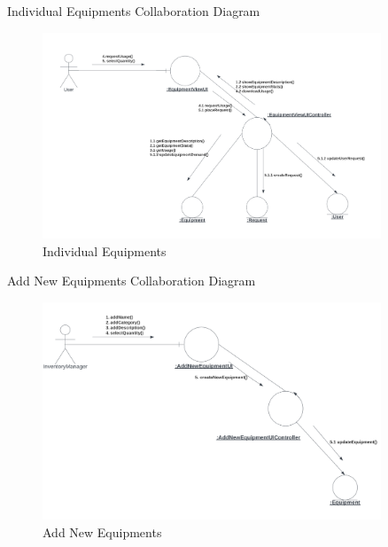\documentclass[20pt]{beamer}
\numberwithin{figure}{section}
\begin{document}
\begin{frame}{Individual Equipments Collaboration Diagram}

     \begin{figure}
        \centering
        \includegraphics[width= 0.9\textwidth , height= 0.6\paperheight]{IndividualEquipmentCollab.png}
        \caption{Individual Equipments}
        \label{fig:20}
    \end{figure}

\end{frame}

\begin{frame}{Add New Equipments Collaboration Diagram}

     \begin{figure}
        \centering
        \includegraphics[width= 0.9\textwidth , height= 0.6\paperheight]{AddNewEquipmentCollab.png}
        \caption{Add New Equipments}
        \label{fig:21}
    \end{figure}

\end{frame}
\end{document}
